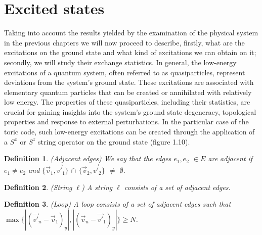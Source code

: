 \documentclass{Configuration_Files/PoliMi3i_thesis}
\newtheorem{definition}{Definition}[chapter]
\begin{document}





















\newpage
\section{Excited states}
\label{sec:ES}


Taking into account the results yielded by the examination of the physical system in the previous chapters we will now proceed to describe, firstly, what are the excitations on the ground state and what kind of excitations we can obtain on it; secondly, we will study their exchange statistics. In general, the low-energy excitations of a quantum system, often referred to as quasiparticles, represent deviations from the system's ground state. These excitations are associated with elementary quantum particles that can be created or annihilated with relatively low energy. The properties of these quasiparticles, including their statistics, are crucial for gaining insights into the system's ground state degeneracy, topological properties and response to external perturbations. \newline
In the particular case of the toric code, such low-energy excitations can be created through the application of a $S^x$ or $S^z$ string operator on the ground state (figure 1.10).

\begin{definition}(Adjacent edges)
	We say that the edges  $e_1, e_2$ $\in E$ are adjacent if $e_1\neq e_2$ and $\{ \vec{v}_1, \vec{v'}_1\}$ $\cap $ $\{ \vec{v}_2, \vec{v'}_2\}$ $\neq$ $\emptyset$.
\end{definition}

\begin{definition}(String $\ell$)
	A string $\ell$ consists of a set of adjacent edges.
\end{definition}

\begin{definition}(Loop)
	A loop consists of a set of adjacent edges such that $\max \{ |(\vec{v'}_n-\vec{v}_1)_y|, |(\vec{v}_n-\vec{v'}_1)_y| \} \ge N$.
\end{definition}
\end{document}
